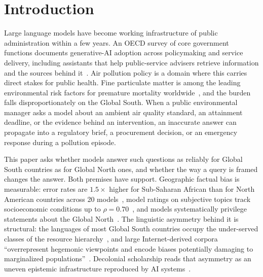 \section{Introduction}
\label{sec:intro}

Large language models have become working infrastructure of public
administration within a few years. An OECD survey of core government functions
documents generative-AI adoption across policymaking and service delivery,
including assistants that help public-service advisers retrieve information and
the sources behind it~\citep{oecd2024governing}. Air pollution policy is a domain
where this carries direct stakes for public health. Fine particulate matter is
among the leading environmental risk factors for premature mortality
worldwide~\citep{gbd2019risk,who2021aqg}, and the burden falls disproportionately
on the Global South. When a public environmental manager asks a model about an
ambient air quality standard, an attainment deadline, or the evidence behind an
intervention, an inaccurate answer can propagate into a regulatory brief, a
procurement decision, or an emergency response during a pollution episode.

This paper asks whether models answer such questions as reliably for Global
South countries as for Global North ones, and whether the way a query is framed
changes the answer. Both premises have support. Geographic factual bias is
measurable: error rates are $1.5\times$ higher for Sub-Saharan African than for
North American countries across 20 models~\citep{moayeri2024worldbench}, model
ratings on subjective topics track socioeconomic conditions up to
$\rho=0.70$~\citep{manvi2024llm}, and models systematically privilege statements
about the Global North~\citep{mirza2024global}. The linguistic asymmetry behind
it is structural: the languages of most Global South countries occupy the
under-served classes of the resource hierarchy~\citep{joshi2020state}, and large
Internet-derived corpora ``overrepresent hegemonic viewpoints and encode biases
potentially damaging to marginalized populations''~\citep{bender2021stochastic}.
Decolonial scholarship reads that asymmetry as an uneven epistemic
infrastructure reproduced by AI systems~\citep{mohamed2020decolonial}.

